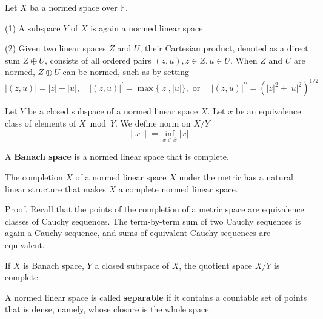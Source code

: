 \documentclass[12pt, oneside]{book}
\begin{document}
\begin{proposition}
    Let $X$ ba a normed space over $\mathbb{F}$.

    (1) A subspace $Y$ of $X$ is again a normed linear space.

    (2) Given two linear spaces $Z$ and $U$, their Cartesian product, denoted as a direct sum $Z \oplus U$, consists of all ordered pairs $(z, u), z \in Z, u \in U$. When $Z$ and $U$ are normed, $Z \oplus U$ can be normed, such as by setting
    \begin{equation*}
        |(z, u)|=|z|+|u|, \quad|(z, u)|^{\prime}=\max \{|z|,|u|\}, \text { or } \quad|(z, u)|^{\prime \prime}=\left(|z|^2+|u|^2\right)^{1 / 2}
    \end{equation*}
\end{proposition}

\begin{definition}
    Let $Y$ be a closed subspace of a normed linear space $X$. Let $\overline{x}$ be an equivalence class of elements of $X \bmod Y$. We define norm on $X/Y$
    \begin{equation*}
        \|\overline{x}\|=\inf _{x\in \overline{x}}\left|x\right|
    \end{equation*}
\end{definition}

\begin{definition}
    A \textbf{Banach space} is a normed linear space that is complete.
\end{definition}

\begin{theorem}
    The completion $\overline{X}$ of a normed linear space $X$ under the metric has a natural linear structure that makes $\overline{X}$ a complete normed linear space.

    Proof. Recall that the points of the completion of a metric space are equivalence classes of Cauchy sequences. The term-by-term sum of two Cauchy sequences is again a Cauchy sequence, and sums of equivalent Cauchy sequences are equivalent.


\end{theorem}

\begin{proposition}
    If $X$ is Banach space, $Y$ a closed subspace of $X$, the quotient space $X / Y$ is complete.
\end{proposition}
\begin{definition}
    A normed linear space is called \textbf{separable} if it contains a countable set of points that is dense, namely, whose closure is the whole space.
\end{definition}
\end{document}
